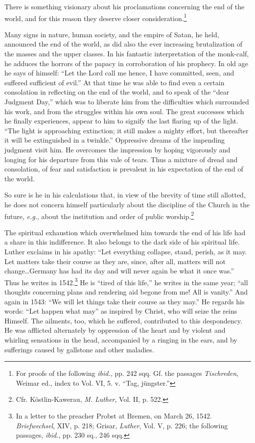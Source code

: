 There is something visionary about his proclamations concerning
the end of the world, and for this reason they deserve closer consideration.\footnote
{For proofs of the following \textit{ibid.}, pp. 242 sqq. Gf. the passages
\textit{Tischreden}, Weimar ed., index to Vol. VI, 5. v. “Tag, jüngster.”}

Many signs in nature, human society, and the empire of Satan, he
held, announced the end of the world, as did also the ever increasing
brutalization of the masses and the upper classes. In his fantastic interpretation
of the monk-calf, he adduces the horrors of the papacy
in corroboration of his prophecy. In old age he says of himself: “Let
the Lord call me hence, I have committed, seen, and suffered sufficient
of evil.” At that time he was able to find even a certain consolation
in reflecting on the end of the world, and to speak of the “dear
Judgment Day,” which was to liberate him from the difficulties which
surrounded his work, and from the struggles within his own soul. The
great successes which he finally experiences, appear to him to signify
the last flaring up of the light. “The light is approaching extinction;
it still makes a mighty effort, but thereafter it will be extinguished in
a twinkle.” Oppressive dreams of the impending judgment visit him.
He overcomes the impression by hoping vigorously and longing for his
departure from this vale of tears. Thus a mixture of dread and consolation,
of fear and satisfaction is prevalent in his expectation of the
end of the world.

So sure is he in his calculations that, in view of the brevity of time
still allotted, he does not concern himself particularly about the discipline
of the Church in the future, \textit{e.g.}, about the institution and
order of public worship.\footnote{Cfr. Köstlin-Kawerau, \textit{M. Luther}, Vol. II, p. 522.}

The spiritual exhaustion which overwhelmed him towards the end
of his life had a share in this indifference. It also belongs to the dark
side of his spiritual life. Luther exclaims in his apathy: “Let everything
collapse, stand, perish, as it may. Let matters take their course
as they are, since, after all, matters will not change\dots Germany
has had its day and will never again be what it once was.” Thus he
writes in 1542.\footnote
{In a letter to the preacher Probst at Bremen, on March 26, 1542. \textit{Briefwechsel}, XIV,
p. 218; Grisar, \textit{Luther}, Vol. V, p. 226; the following passages, \textit{ibid.}, pp. 230 sq., 246
sqq.}
He is “tired of this life,” he writes in the same year;
“all thoughts concerning plans and rendering aid begone from me!
All is vanity.” And again in 1543: “We will let things take their
course as they may.” He regards his words: “Let happen what may”
as inspired by Christ, who will seize the reins Himself. The ailments,
too, which he suffered, contributed to this despondency. He was
afflicted alternately by oppression of the heart and by violent and
whirling sensations in the head, accompanied by a ringing in the
ears, and by sufferings caused by gallstone and other maladies.

